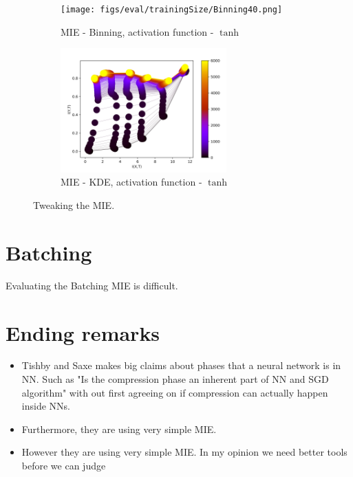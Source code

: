 \documentclass[dissertation.tex]{subfiles}
\begin{document}
\begin{figure}[ht]
  \centering
  \begin{subfigure}[t]{0.49\textwidth}
    \centering
    \texttt{[image: figs/eval/trainingSize/Binning40.png]}
    \caption{
      MIE - Binning, activation function - $\tanh$
    }
    \label{figKDEBinBin}
  \end{subfigure}
  \begin{subfigure}[t]{0.49\textwidth}
    \centering
    \includegraphics[width=0.7\textwidth]{figs/eval/trainingSize/KDE40.png}
    \caption{
      MIE - KDE, activation function - $\tanh$
    }
    \label{figKDEBinKDE}
  \end{subfigure}
  \caption{
      Tweaking the MIE.
    }
  \label{figKDEBinning}
\end{figure}

\section{Batching} 

Evaluating the Batching MIE is difficult.

\section{Ending remarks}
 
\begin{itemize}
  \item{
      Tishby and Saxe makes big claims about phases that a neural network is in
      NN. Such as "Is the compression phase an inherent part of NN and SGD
      algorithm" with out first agreeing on if compression can actually happen
      inside NNs.
    }
  \item{
      Furthermore, they are using very simple MIE.
    }
  \item{
      However they are using very simple MIE. In my opinion we need better tools
      before we can judge 
    }
\end{itemize}
\end{document}
